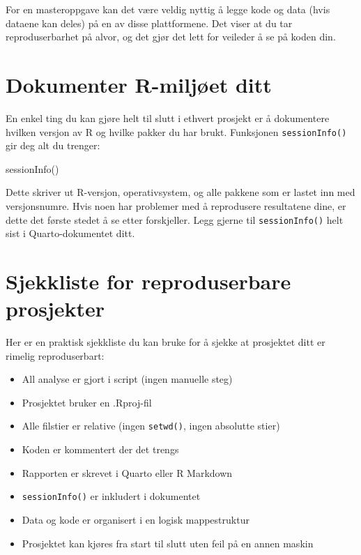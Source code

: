 \documentclass[
  norsk,
  letterpaper,
  DIV=11,
  numbers=noendperiod]{scrreprt}
\newenvironment{Shaded}{\begin{snugshade}}{\end{snugshade}}
\newcommand{\FunctionTok}[1]{\textcolor[rgb]{0.28,0.35,0.67}{#1}}
\newcommand{\NormalTok}[1]{\textcolor[rgb]{0.00,0.23,0.31}{#1}}
\providecommand{\tightlist}{%
  \setlength{\itemsep}{0pt}\setlength{\parskip}{0pt}}
\theoremstyle{definition}
\theoremstyle{remark}
\begin{document}
For en masteroppgave kan det være veldig nyttig å legge kode og data
(hvis dataene kan deles) på en av disse plattformene. Det viser at du
tar reproduserbarhet på alvor, og det gjør det lett for veileder å se på
koden din.

\section{Dokumenter R-miljøet ditt}\label{dokumenter-r-miljuxf8et-ditt}

En enkel ting du kan gjøre helt til slutt i ethvert prosjekt er å
dokumentere hvilken versjon av R og hvilke pakker du har brukt.
Funksjonen \texttt{sessionInfo()} gir deg alt du trenger:

\begin{Shaded}
\begin{Highlighting}[]
\FunctionTok{sessionInfo}\NormalTok{()}
\end{Highlighting}
\end{Shaded}

Dette skriver ut R-versjon, operativsystem, og alle pakkene som er
lastet inn med versjonsnumre. Hvis noen har problemer med å reprodusere
resultatene dine, er dette det første stedet å se etter forskjeller.
Legg gjerne til \texttt{sessionInfo()} helt sist i Quarto-dokumentet
ditt.

\section{Sjekkliste for reproduserbare
prosjekter}\label{sjekkliste-for-reproduserbare-prosjekter}

Her er en praktisk sjekkliste du kan bruke for å sjekke at prosjektet
ditt er rimelig reproduserbart:

\begin{itemize}
\tightlist
\item[$\square$]
  All analyse er gjort i script (ingen manuelle steg)
\item[$\square$]
  Prosjektet bruker en .Rproj-fil
\item[$\square$]
  Alle filstier er relative (ingen \texttt{setwd()}, ingen absolutte
  stier)
\item[$\square$]
  Koden er kommentert der det trengs
\item[$\square$]
  Rapporten er skrevet i Quarto eller R Markdown
\item[$\square$]
  \texttt{sessionInfo()} er inkludert i dokumentet
\item[$\square$]
  Data og kode er organisert i en logisk mappestruktur
\item[$\square$]
  Prosjektet kan kjøres fra start til slutt uten feil på en annen maskin
\end{itemize}
\end{document}
